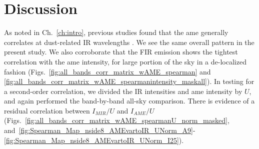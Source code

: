 
    \section{Discussion}
        As noted in Ch.~\ref{ch:intro}, previous studies found that the \acrshort{ame} generally correlates at dust-related IR wavelengths \citep{ysard10b,planckXV, hensley16}. We see the same overall pattern in the present study. We also corroborate that the FIR emission shows the tightest correlation with the \acrshort{ame} intensity, for large portion of the sky in a de-localized fashion (Figs.~\ref{fig:all_bands_corr_matrix_wAME_spearman} and~ \ref{fig:all_bands_corr_matrix_wAME_spearmanintensity_maskall}). In testing for a second-order correlation, we divided the IR intensities and \acrshort{ame} intensity by $U$, and again performed the band-by-band all-sky comparison. There is evidence of a residual correlation between $I_{MIR}/U$ and $I_{AME}/U$ (Figs.~\ref{fig:all_bands_corr_matrix_wAME_spearmanU_norm_masked}, and~\ref{fig:Spearman_Map_nside8_AMEvartoIR_UNorm_A9}-\ref{fig:Spearman_Map_nside8_AMEvartoIR_UNorm_I25}).

